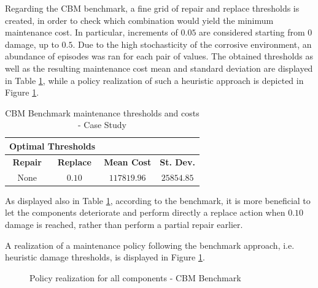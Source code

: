 Regarding the \gls{CBM} benchmark, a fine grid of repair and replace thresholds is created, in order to check which combination would yield the minimum maintenance cost. In particular, increments of $0.05$ are considered starting from $0$ damage, up to $0.5$. Due to the high stochasticity of the corrosive environment, an abundance of episodes was ran for each pair of values. The obtained thresholds as well as the resulting maintenance cost mean and standard deviation are displayed in Table \ref{benchValuesCase}, while a policy realization of such a heuristic approach is depicted in Figure \ref{benchCasePol}.

\begin{table}[H]
    \centering
    \caption{\acrshort{CBM} Benchmark maintenance thresholds and costs - Case Study}
    \label{benchValuesCase}
    \begin{tabular}{cccc}
        \multicolumn{2}{c}{\textbf{Optimal Thresholds}} & & \\ \toprule
        \textbf{Repair} & \textbf{Replace} & \textbf{Mean Cost} & \multicolumn{1}{c}{\textbf{St. Dev.}} \\ \midrule
        None & $0.10$ & $\boldsymbol{117819.96}$  & $25854.85$ \\ \bottomrule
    \end{tabular}
\end{table}

As displayed also in Table \ref{benchValuesCase}, according to the benchmark, it is more beneficial to let the components deteriorate and perform directly a replace action when $0.10$ damage is reached, rather than perform a partial repair earlier.

\newpage

A realization of a maintenance policy following the benchmark approach, i.e. heuristic damage thresholds, is displayed in Figure \ref{benchCasePol}.

\begin{figure}[H]
    \centering
	\caption{Policy realization for all components - \acrshort{CBM} Benchmark}
	\label{benchCasePol}
\end{figure}


